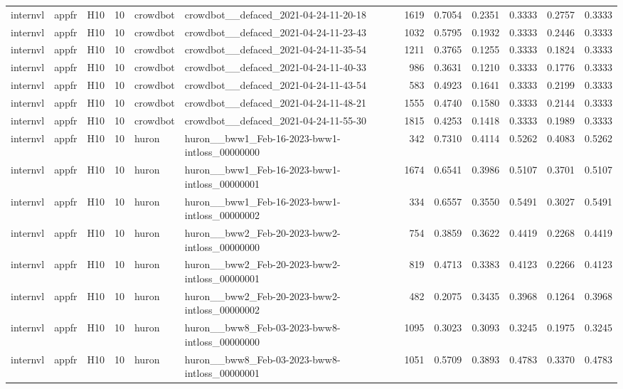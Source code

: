 \begin{table}[tbp]
\begin{tabular}{lllrllrrrrrr}
internvl & appfr & H10 & 10 & crowdbot & crowdbot\_\_defaced\_2021-04-24-11-20-18 & 1619 & 0.7054 & 0.2351 & 0.3333 & 0.2757 & 0.3333 \\
internvl & appfr & H10 & 10 & crowdbot & crowdbot\_\_defaced\_2021-04-24-11-23-43 & 1032 & 0.5795 & 0.1932 & 0.3333 & 0.2446 & 0.3333 \\
internvl & appfr & H10 & 10 & crowdbot & crowdbot\_\_defaced\_2021-04-24-11-35-54 & 1211 & 0.3765 & 0.1255 & 0.3333 & 0.1824 & 0.3333 \\
internvl & appfr & H10 & 10 & crowdbot & crowdbot\_\_defaced\_2021-04-24-11-40-33 & 986 & 0.3631 & 0.1210 & 0.3333 & 0.1776 & 0.3333 \\
internvl & appfr & H10 & 10 & crowdbot & crowdbot\_\_defaced\_2021-04-24-11-43-54 & 583 & 0.4923 & 0.1641 & 0.3333 & 0.2199 & 0.3333 \\
internvl & appfr & H10 & 10 & crowdbot & crowdbot\_\_defaced\_2021-04-24-11-48-21 & 1555 & 0.4740 & 0.1580 & 0.3333 & 0.2144 & 0.3333 \\
internvl & appfr & H10 & 10 & crowdbot & crowdbot\_\_defaced\_2021-04-24-11-55-30 & 1815 & 0.4253 & 0.1418 & 0.3333 & 0.1989 & 0.3333 \\
internvl & appfr & H10 & 10 & huron & huron\_\_bww1\_Feb-16-2023-bww1-intloss\_00000000 & 342 & 0.7310 & 0.4114 & 0.5262 & 0.4083 & 0.5262 \\
internvl & appfr & H10 & 10 & huron & huron\_\_bww1\_Feb-16-2023-bww1-intloss\_00000001 & 1674 & 0.6541 & 0.3986 & 0.5107 & 0.3701 & 0.5107 \\
internvl & appfr & H10 & 10 & huron & huron\_\_bww1\_Feb-16-2023-bww1-intloss\_00000002 & 334 & 0.6557 & 0.3550 & 0.5491 & 0.3027 & 0.5491 \\
internvl & appfr & H10 & 10 & huron & huron\_\_bww2\_Feb-20-2023-bww2-intloss\_00000000 & 754 & 0.3859 & 0.3622 & 0.4419 & 0.2268 & 0.4419 \\
internvl & appfr & H10 & 10 & huron & huron\_\_bww2\_Feb-20-2023-bww2-intloss\_00000001 & 819 & 0.4713 & 0.3383 & 0.4123 & 0.2266 & 0.4123 \\
internvl & appfr & H10 & 10 & huron & huron\_\_bww2\_Feb-20-2023-bww2-intloss\_00000002 & 482 & 0.2075 & 0.3435 & 0.3968 & 0.1264 & 0.3968 \\
internvl & appfr & H10 & 10 & huron & huron\_\_bww8\_Feb-03-2023-bww8-intloss\_00000000 & 1095 & 0.3023 & 0.3093 & 0.3245 & 0.1975 & 0.3245 \\
internvl & appfr & H10 & 10 & huron & huron\_\_bww8\_Feb-03-2023-bww8-intloss\_00000001 & 1051 & 0.5709 & 0.3893 & 0.4783 & 0.3370 & 0.4783 \\

\end{tabular}
\end{table}
